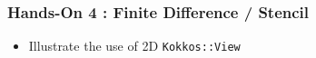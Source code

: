 \begin{frame}[fragile=singleslide]
  \frametitle{Hands-On 4 : Finite Difference / Stencil}

  \begin{itemize}
  \item Illustrate the use of 2D \texttt{Kokkos::View}
  \end{itemize}
  
\end{frame}
